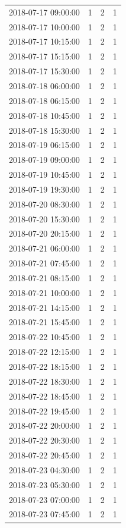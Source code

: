 \begin{tabular}{lrrr}
2018-07-17 09:00:00 & 1 & 2 & 1 \\
2018-07-17 10:00:00 & 1 & 2 & 1 \\
2018-07-17 10:15:00 & 1 & 2 & 1 \\
2018-07-17 15:15:00 & 1 & 2 & 1 \\
2018-07-17 15:30:00 & 1 & 2 & 1 \\
2018-07-18 06:00:00 & 1 & 2 & 1 \\
2018-07-18 06:15:00 & 1 & 2 & 1 \\
2018-07-18 10:45:00 & 1 & 2 & 1 \\
2018-07-18 15:30:00 & 1 & 2 & 1 \\
2018-07-19 06:15:00 & 1 & 2 & 1 \\
2018-07-19 09:00:00 & 1 & 2 & 1 \\
2018-07-19 10:45:00 & 1 & 2 & 1 \\
2018-07-19 19:30:00 & 1 & 2 & 1 \\
2018-07-20 08:30:00 & 1 & 2 & 1 \\
2018-07-20 15:30:00 & 1 & 2 & 1 \\
2018-07-20 20:15:00 & 1 & 2 & 1 \\
2018-07-21 06:00:00 & 1 & 2 & 1 \\
2018-07-21 07:45:00 & 1 & 2 & 1 \\
2018-07-21 08:15:00 & 1 & 2 & 1 \\
2018-07-21 10:00:00 & 1 & 2 & 1 \\
2018-07-21 14:15:00 & 1 & 2 & 1 \\
2018-07-21 15:45:00 & 1 & 2 & 1 \\
2018-07-22 10:45:00 & 1 & 2 & 1 \\
2018-07-22 12:15:00 & 1 & 2 & 1 \\
2018-07-22 18:15:00 & 1 & 2 & 1 \\
2018-07-22 18:30:00 & 1 & 2 & 1 \\
2018-07-22 18:45:00 & 1 & 2 & 1 \\
2018-07-22 19:45:00 & 1 & 2 & 1 \\
2018-07-22 20:00:00 & 1 & 2 & 1 \\
2018-07-22 20:30:00 & 1 & 2 & 1 \\
2018-07-22 20:45:00 & 1 & 2 & 1 \\
2018-07-23 04:30:00 & 1 & 2 & 1 \\
2018-07-23 05:30:00 & 1 & 2 & 1 \\
2018-07-23 07:00:00 & 1 & 2 & 1 \\
2018-07-23 07:45:00 & 1 & 2 & 1 \\

\end{tabular}
